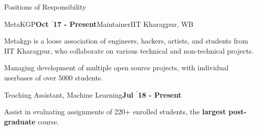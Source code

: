 \documentclass{resume} %
\begin{document}

\begin{rSection}{Positions of Responsibility}

\begin{rSubsection}{\large MetaKGP}{\textbf{\large Oct $^{\prime}$17 - Present}}{Maintainer}{IIT Kharagpur, WB}
\item Metakgp is a loose association of engineers, hackers, artists, and students from IIT Kharagpur, who collaborate on various technical and non-technical projects.
\item Managing development of multiple open source projects, with individual userbases of over 5000 students.
\end{rSubsection}



\begin{rSubsection}{\large Teaching Assistant, Machine Learning}{\textbf{\large Jul $^{\prime}$18 - Present}}{}{}
\item Assist in evaluating assignments of 220+ enrolled students, the \textbf{largest post-graduate} course.
\end{rSubsection}

\end{rSection}

\end{document}
